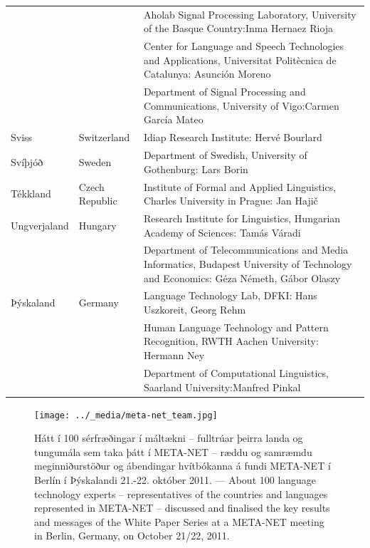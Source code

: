 \begin{longtable}{llp{105mm}}
  & & Aholab Signal Processing Laboratory, University of the Basque Country:\newline Inma Hernaez Rioja \\ \addlinespace 
  & & Center for Language and Speech Technologies and Applications, Universitat Politècnica de Catalunya:  Asunción Moreno \\ \addlinespace 
  & & Department of Signal Processing and Communications, University of Vigo:\newline Carmen García Mateo \\ \addlinespace 
  Sviss & \textcolor{grey1}{Switzerland} & Idiap Research Institute: Hervé Bourlard \\ \addlinespace 
  Svíþjóð & \textcolor{grey1}{Sweden} & Department of Swedish, University of Gothenburg: Lars Borin \\ \addlinespace 
  Tékkland & \textcolor{grey1}{Czech Republic} & Institute of Formal and Applied Linguistics, Charles University in Prague: \newline Jan Hajič \\ \addlinespace
  Ungverjaland & \textcolor{grey1}{Hungary} & Research Institute for Linguistics, Hungarian Academy of Sciences: \newline Tamás Váradi\\  \addlinespace
  & & Department of Telecommunications and Media Informatics, Budapest University of Technology and Economics: Géza Németh, Gábor Olaszy\\ \addlinespace
  Þýskaland & \textcolor{grey1}{Germany} & Language Technology Lab, DFKI: Hans Uszkoreit, Georg Rehm\\ \addlinespace
  & & Human Language Technology and Pattern Recognition, RWTH Aachen University: Hermann Ney \\ \addlinespace
  & & Department of Computational Linguistics, Saarland University:\newline Manfred Pinkal
\end{longtable}
\normalsize

\renewcommand*{\figureformat}{}
\renewcommand*{\captionformat}{}

\begin{figure}[htbp]
  \center
  \texttt{[image: ../\_media/meta-net\_team.jpg]}
  \caption{Hátt í 100 sérfræðingar í máltækni -- fulltrúar þeirra landa og tungumála sem taka þátt í META-NET -- ræddu og samræmdu meginniðurstöður og ábendingar hvítbókanna á fundi META-NET í Berlín í Þýskalandi 21.-22. október 2011. --- \textcolor{grey1}{About 100 language technology experts -- representatives of the countries and languages represented in META-NET -- discussed and finalised the key results and messages of the White Paper Series at a META-NET meeting in Berlin, Germany, on October 21/22, 2011.}}
  \medskip
\end{figure}


